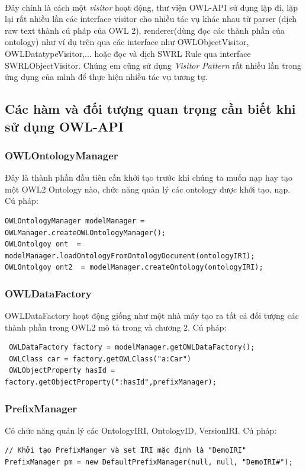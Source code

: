 \\
Đây chính là cách một \textit{visitor} hoạt động, thư viện OWL-API sử dụng lặp đi, lặp lại rất nhiều lần các interface visitor cho nhiều tác vụ khác nhau từ parser (dịch raw text thành cú pháp của OWL 2), renderer(dùng đọc các thành phần của ontology) như ví dụ trên qua các interface như OWLObjectVisitor, OWLDatatypeVisitor,... hoặc đọc và dịch SWRL Rule qua interface SWRLObjectVisitor. Chúng em cũng sử dụng \textit{Visitor Pattern} rất nhiều lần trong ứng dụng của mình để thực hiện nhiều tác vụ tương tự.
\subsection{Các hàm và đối tượng quan trọng cần biết khi sử dụng OWL-API}
\subsubsection{OWLOntologyManager}
Đây là thành phần đầu tiên cần khởi tạo trước khi chúng ta muốn nạp hay tạo một OWL2 Ontology nào, chức năng quản lý các ontology được khởi tạo, nạp. Cú pháp:
\begin{verbatim}
OWLOntologyManager modelManager = OWLManager.createOWLOntologyManager();
OWLOntolgoy ont  = modelManager.loadOntologyFromOntologyDocument(ontologyIRI);
OWLOntolgoy ont2  = modelManager.createOntology(ontologyIRI);
\end{verbatim}
\subsubsection{OWLDataFactory}
OWLDataFactory hoạt động giống như một nhà máy tạo ra tất cả đối tượng các thành phần trong OWL2 mô tả trong \cite{owl2spec} và chương 2. Cú pháp:
\begin{verbatim}
 OWLDataFactory factory = modelManager.getOWLDataFactory();
 OWLClass car = factory.getOWLClass("a:Car")
 OWLObjectProperty hasId = factory.getObjectProperty(":hasId",prefixManager);
\end{verbatim}
\subsubsection{PrefixManager}
Có chức năng quản lý các OntologyIRI, OntologyID, VersionIRI. Cú pháp:
\begin{verbatim}
// Khởi tạo PrefixManger và set IRI mặc định là "DemoIRI"
PrefixManager pm = new DefaultPrefixManager(null, null, "DemoIRI#");
\end{verbatim}
